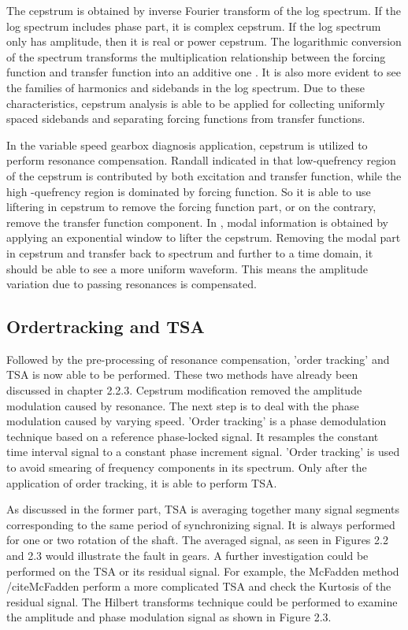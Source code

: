 The cepstrum is obtained by inverse Fourier transform of the log spectrum. If the log spectrum includes phase part, it is complex cepstrum. If the log spectrum only has amplitude, then it is real or power cepstrum. The logarithmic conversion of the spectrum transforms the multiplication relationship between the forcing function and transfer function into an additive one \cite{vbcm}. It is also more evident to see the families of harmonics and sidebands in the log spectrum. Due to these characteristics, cepstrum analysis is able to be applied for collecting uniformly spaced sidebands and separating forcing functions from transfer functions.

In the variable speed gearbox diagnosis application, cepstrum is utilized to perform resonance compensation. Randall indicated in \cite{resonance} that low-quefrency region of the cepstrum is contributed by both excitation and transfer function, while the high -quefrency region is dominated by forcing function. So it is able to use liftering in cepstrum to remove the forcing function part, or on the contrary, remove the transfer function component. In \cite{varyspeed}, modal information is obtained by applying an exponential window to lifter the cepstrum. Removing the modal part in cepstrum and transfer back to spectrum and further to a time domain, it should be able to see a more uniform waveform. This means the amplitude variation due to passing resonances is compensated.

\subsection{Ordertracking and TSA}

Followed by the pre-processing of resonance compensation, 'order tracking' and TSA is now able to be performed. These two methods have already been discussed in chapter 2.2.3. Cepstrum modification removed the amplitude modulation caused by resonance. The next step is to deal with the phase modulation caused by varying speed. 'Order tracking' is a phase demodulation technique based on a reference phase-locked signal. It resamples the constant time interval signal to a constant phase increment signal. 'Order tracking' is used to avoid smearing of frequency components in its spectrum. Only after the application of order tracking, it is able to perform TSA.

As discussed in the former part, TSA is averaging together many signal segments corresponding to the same period of synchronizing signal. It is always performed for one or two rotation of the shaft. The averaged signal, as seen in Figures 2.2 and 2.3 would illustrate the fault in gears. A further investigation could be performed on the TSA or its residual signal. For example, the McFadden method /cite{McFadden} perform a more complicated TSA and check the Kurtosis of the residual signal. The Hilbert transforms technique \cite{mc4} could be performed to examine the amplitude and phase modulation signal as shown in Figure 2.3.

